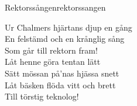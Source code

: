 \begin{song}{Rektorssången}{rektorssangen}
\begin{vers}
Ur Chalmers hjärtans djup en gång\\
En felstämd och en krånglig sång\\
Som går till rektorn fram!  \\
Låt henne göra tentan lätt\\
Sätt mössan på'nas hjässa snett\\
Låt bäsken flöda vitt och brett\\
Till törstig teknolog!\\
\end{vers}
\end{song}
